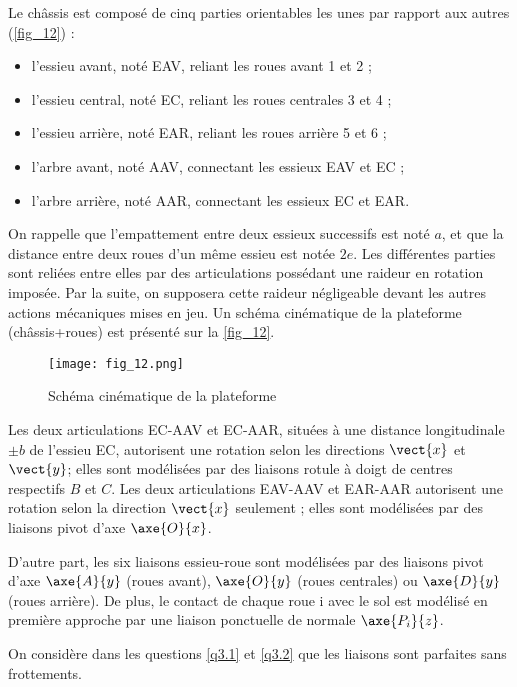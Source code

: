 Le châssis est composé de cinq parties orientables les unes par rapport aux autres (\autoref{fig_12}) :
\begin{itemize}
\item l'essieu avant, noté EAV, reliant les roues avant 1 et 2 ;
\item l'essieu central, noté EC, reliant les roues centrales 3 et 4 ;
\item l'essieu arrière, noté EAR, reliant les roues arrière 5 et 6 ;
\item l'arbre avant, noté AAV, connectant les essieux EAV et EC ;
\item l'arbre arrière, noté AAR, connectant les essieux EC et EAR.
\end{itemize}
On rappelle que l'empattement entre deux essieux successifs est noté $a$, et que la distance entre
deux roues d'un même essieu est notée $2e$.
Les différentes parties sont reliées entre elles par des articulations possédant une raideur en
rotation imposée. Par la suite, on supposera cette raideur négligeable devant les autres actions
mécaniques mises en jeu.
Un schéma cinématique de la plateforme (châssis+roues) est présenté sur la \autoref{fig_12}.

\begin{figure}[H]
\centering
\texttt{[image: fig\_12.png]}
\caption{Schéma cinématique de la plateforme\label{fig_12}}
\end{figure}

Les deux articulations EC-AAV et EC-AAR, situées à une distance longitudinale $\pm b$ de l'essieu
EC, autorisent une rotation selon les directions $\vect{x}$ et $\vect{y}$; elles sont modélisées par des liaisons
rotule à doigt de centres respectifs $B$ et $C$. Les deux articulations EAV-AAV et EAR-AAR
autorisent une rotation selon la direction $\vect{x}$ seulement ; elles sont modélisées par des liaisons
pivot d'axe $\axe{O}{x}$.

D'autre part, les six liaisons essieu-roue sont modélisées par des liaisons pivot d'axe $\axe{A}{y}$
(roues avant), $\axe{O}{y}$ (roues centrales) ou $\axe{D}{y}$ (roues arrière). De plus, le contact de chaque
roue i avec le sol est modélisé en première approche par une liaison ponctuelle de normale
$\axe{P_i}{z}$.

On considère dans les questions \ref{q3.1} et \ref{q3.2} que les liaisons sont parfaites sans frottements.



